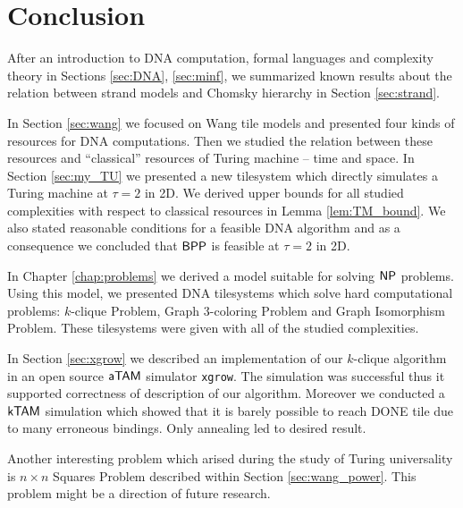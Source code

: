 \cleardoublepage{}   %
\chapter*{Conclusion}

After an introduction to DNA computation, formal languages and complexity theory in Sections \ref{sec:DNA}, \ref{sec:minf}, we summarized known results about the relation between strand models and Chomsky hierarchy in Section \ref{sec:strand}.

In Section \ref{sec:wang} we focused on Wang tile models and presented four kinds of resources for DNA computations. Then we studied the relation between these resources and ``classical'' resources of Turing machine -- time and space. In Section \ref{sec:my_TU} we presented a new tilesystem which directly simulates a Turing machine at $\tau = 2$ in 2D. We derived upper bounds for all studied complexities with respect to classical resources in Lemma \ref{lem:TM_bound}. We also stated reasonable conditions for a feasible DNA algorithm and as a consequence we concluded that $\mathsf{BPP}$ is feasible at $\tau = 2$ in 2D.

In Chapter \ref{chap:problems} we derived a model suitable for solving $\mathsf{NP}$ problems. Using this model, we presented DNA tilesystems which solve hard computational problems: $k$-clique Problem, Graph 3-coloring Problem and Graph Isomorphism Problem. These tilesystems were given with all of the studied complexities.

In Section \ref{sec:xgrow} we described an implementation of our $k$-clique algorithm in an open source $\mathsf{aTAM}$ simulator {\tt xgrow}. The simulation was successful thus it supported correctness of description of our algorithm. Moreover we conducted a $\mathsf{kTAM}$ simulation which showed that it is barely possible to reach DONE tile due to many erroneous bindings. Only annealing led to desired result.

Another interesting problem which arised during the study of Turing universality is $n\times n$ Squares Problem described within Section \ref{sec:wang_power}. This problem might be a direction of future research.

